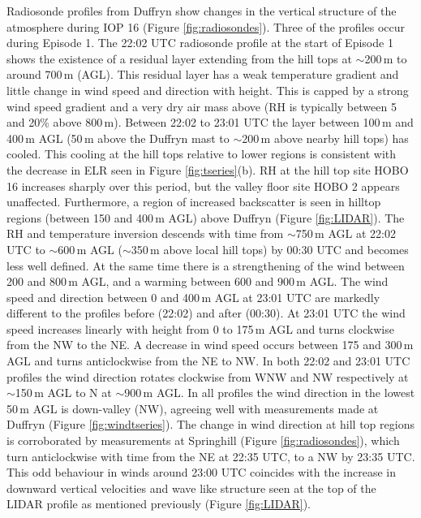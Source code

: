 \documentclass[times]{qjrms4}
\begin{document}
Radiosonde profiles from Duffryn show changes in the vertical structure of the atmosphere during IOP 16 (Figure \ref{fig:radiosondes}). Three of the profiles occur during Episode 1. The 22:02 UTC radiosonde profile at the start of Episode 1 shows the existence of a residual layer extending from the hill tops at $\sim$200$\,\mbox{m}$ to around 700$\,\mbox{m}$ (AGL). This residual layer has a weak temperature gradient and little change in wind speed and direction with height. This is capped by a strong wind speed gradient and a very dry air mass above (RH is typically between 5 and 20\% above 800$\,\mbox{m}$). Between 22:02 to 23:01 UTC the layer between 100$\,\mbox{m}$ and 400$\,\mbox{m}$ AGL (50$\,\mbox{m}$ above the Duffryn mast to $\sim$200$\,\mbox{m}$ above nearby hill tops) has cooled. This cooling at the hill tops relative to lower regions is consistent with the decrease in ELR seen in Figure \ref{fig:tseries}(b). RH at the hill top site HOBO 16 increases sharply over this period, but the valley floor site HOBO 2 appears unaffected. Furthermore, a region of increased backscatter is seen in hilltop regions (between 150 and 400$\,\mbox{m}$ AGL) above Duffryn (Figure \ref{fig:LIDAR}). The RH and temperature inversion descends with time from $\sim$750$\,\mbox{m}$ AGL at 22:02 UTC to $\sim$600$\,\mbox{m}$ AGL ($\sim$350$\,\mbox{m}$ above local hill tops) by 00:30 UTC and becomes less well defined. At the same time there is a strengthening of the wind between 200 and 800$\,\mbox{m}$ AGL, and a warming between 600 and 900$\,\mbox{m}$ AGL. The wind speed and direction between 0 and 400$\,\mbox{m}$ AGL at 23:01 UTC are markedly different to the profiles before (22:02) and after (00:30). At 23:01 UTC the wind speed increases linearly with height from 0 to 175$\,\mbox{m}$ AGL and turns clockwise from the NW to the NE. A decrease in wind speed occurs between 175 and 300$\,\mbox{m}$ AGL and turns anticlockwise from the NE to NW. In both 22:02 and 23:01 UTC profiles the wind direction rotates clockwise from WNW and NW respectively at $\sim$150$\,\mbox{m}$ AGL to N at $\sim$900$\,\mbox{m}$ AGL. In all profiles the wind direction in the lowest 50$\,\mbox{m}$ AGL is down-valley (NW), agreeing well with measurements made at Duffryn (Figure \ref{fig:windtseries}). The change in wind direction at hill top regions is corroborated by measurements at Springhill (Figure \ref{fig:radiosondes}), which turn anticlockwise with time from the NE at 22:35 UTC, to a NW by 23:35 UTC. This odd behaviour in winds around 23:00 UTC coincides with the increase in downward vertical velocities and wave like structure seen at the top of the LIDAR profile as mentioned previously (Figure \ref{fig:LIDAR}).
\end{document}
